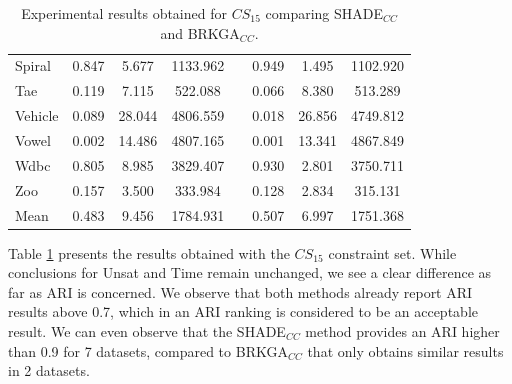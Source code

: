\documentclass[review]{elsarticle}
\begin{document}
\begin{table}[!h]
{\begin{tabular}{l ccc c ccc}
			Spiral & 0.847 & 5.677 & 1133.962 && 0.949 & 1.495 & 1102.920 \\
			Tae & 0.119 & 7.115 & 522.088 && 0.066 & 8.380 & 513.289 \\
			Vehicle & 0.089 & 28.044 & 4806.559 && 0.018 & 26.856 & 4749.812 \\
			Vowel & 0.002 & 14.486 & 4807.165 && 0.001 & 13.341 & 4867.849 \\
			Wdbc & 0.805 & 8.985 & 3829.407 && 0.930 & 2.801 & 3750.711 \\
			Zoo & 0.157 & 3.500 & 333.984 && 0.128 & 2.834 & 315.131 \\
			\hline
			Mean & 0.483 & 9.456 & 1784.931 && 0.507 & 6.997 & 1751.368 \\
			\hline

		\end{tabular}}

	\caption{Experimental results obtained for $CS_{15}$ comparing SHADE$_{CC}$ and BRKGA$_{CC}$.}
	\label{tab:results15}
\end{table}

Table \ref{tab:results15} presents the results obtained with the $CS_{15}$ constraint set. While conclusions for Unsat and Time remain unchanged, we see a clear difference as far as ARI is concerned. We observe that both methods already report ARI results above 0.7, which in an ARI ranking is considered to be an acceptable result. We can even observe that the SHADE$_{CC}$ method provides an ARI higher than 0.9 for 7 datasets, compared to BRKGA$_{CC}$ that only obtains similar results in 2 datasets.
\end{document}
